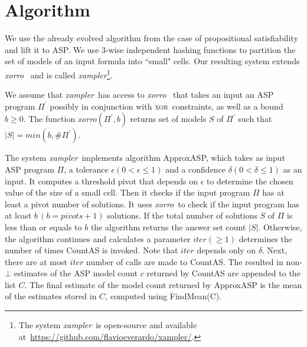 \documentclass{article}
\newcommand{\XOR}{\textsc{xor}} %
\newcommand{\fff}{\ensuremath{\Pi}\xspace}
\newcommand{\ep}{$\epsilon$\xspace}
\newcommand{\del}{$\delta$\xspace}
\def\appasp{\normalfont \textsf{ApproxASP}\xspace}
\def\countas{\normalfont \textsf{CountAS}\xspace}
\newcommand{\sysfont}{\textit}
\newcommand{\xorro}{\sysfont{xorro}}
\newcommand{\xampler}{\sysfont{xampler}}
\begin{document}
\section{Algorithm} \label{approxasp}We use the already evolved algorithm from the case of propositional satisfiability~\cite{ChakrabortyMV13} and lift it to ASP.
%
We use 3-wise independent hashing functions to partition the set of models of an input formula into ``small" cells.
%
Our resulting system extends \xorro~\cite{DBLP:conf/lpnmr/EverardoJKS19} and is called \xampler\footnote{The system \xampler\ is open-source and available at~\url{https://github.com/flavioeverardo/xampler/}.}.


We assume that \xampler\ has access to \xorro~\cite{DBLP:conf/lpnmr/EverardoJKS19} that takes an input an ASP program $\fff^{\prime}$ possibly in conjunction with \XOR\ constraints, as well as a bound $b\geq0$.
%
The function \xorro $(\fff^{\prime},b)$ returns set of models $S$ of $\fff^{\prime}$ such that $|S| = min(b, \#\fff^{\prime})$.
%

The system \xampler\ implements algorithm \appasp, which takes as input ASP program $\fff$, a tolerance \ep $(0 < \epsilon \leq 1)$ and a confidence \del $(0 < \delta \leq 1)$ as an input.
%
It computes a threshold pivot that depends on \ep to determine the chosen value of the size of a small cell.
%
Then it checks if the input program $\fff$ has at least a pivot number of solutions.
%
It uses \xorro\ to check if the input program has at least $b \, (b = pivots+ 1)$ solutions.
%
If the total number of solutions $S$ of $\fff$ is less than or equals to $b$ the algorithm returns the answer set count $|S|$. 
%
Otherwise, the algorithm continues and calculates a parameter $iter (\geq 1)$ determines the number of times \countas is invoked.
%
Note that $iter$ depends only on \del.
%
Next, there are at most $iter$ number of calls are made to \countas.
%
The resulted in non-$\bot$ estimates of the ASP model count $c$ returned by \countas are appended to the list $C$. 
%
The final estimate of the model count returned by \appasp is the mean of the estimates stored in $C$, computed using FindMean(C).
\end{document}
